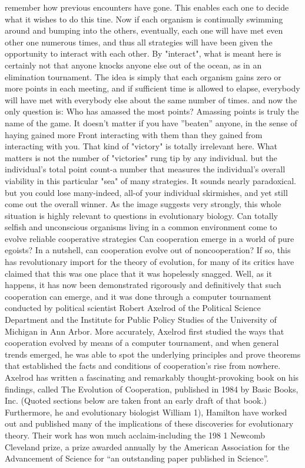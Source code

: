 remember how previous encounters have gone. This enables each one to decide what it
wishes to do this tine. Now if each organism is continually swimming around and
bumping into the others, eventually, each one will have met even other one numerous
times, and thus all strategies will have been given the opportunity to interact with each
other. By "interact", what is meant here is certainly not that anyone knocks anyone else
out of the ocean, as in an elimination tournament. The idea is simply that each organism
gains zero or more points in each meeting, and if sufficient time is allowed to elapse,
everybody will have met with everybody else about the same number of times. and now
the only question is: Who has amassed the most points? Amassing points is truly the
name of the game.
         It doesn't matter if you have ''beaten'' anyone, in the sense of haying gained more
Front interacting with them than they gained from interacting with you. That kind of
"victory" is totally irrelevant here. What matters is not the number of "victories" rung tip
by any individual. but the individual's total point count-a number that measures the
individual's overall viability in this particular "sea" of many strategies. It sounds nearly
paradoxical. but you could lose many-indeed, all-of your individual skirmishes, and yet
still come out the overall winner.
         As the image suggests very strongly, this whole situation is highly relevant to
questions in evolutionary biology. Can totally selfish and unconscious organisms living
in a common environment come to evolve reliable cooperative strategies Can cooperation
emerge in a world of pure egoists? In a nutshell, can cooperation evolve out of
noncooperation? If so, this has revolutionary import for the theory of evolution, for many
of its critics have claimed that this was one place that it was hopelessly snagged.
         Well, as it happens, it has now been demonstrated rigorously and definitively that
such cooperation can emerge, and it was done through a computer tournament conducted
by political scientist Robert Axelrod of the Political Science Department and the Institute
for Public Policy Studies of the University of Michigan in Ann Arbor. More accurately,
Axelrod first studied the ways that cooperation evolved by means of a computer
tournament, and when general trends emerged, he was able to spot the underlying
principles and prove theorems that established the facts and conditions of cooperation's
rise from nowhere. Axelrod has written a fascinating and remarkably thought-provoking
book on his findings, called The Evolution of Cooperation, published in 1984 by Basic
Books, Inc. (Quoted sections below are taken front an early draft of that book.)
Furthermore, he and evolutionary biologist William 1), Hamilton have worked out and
published many of the implications of these discoveries for evolutionary theory. Their
work has won much acclaim-including the 198 1 Newcomb Cleveland prize, a prize
awarded annually by the American Association for the Advancement of Science for “an
outstanding paper published in Science”.




